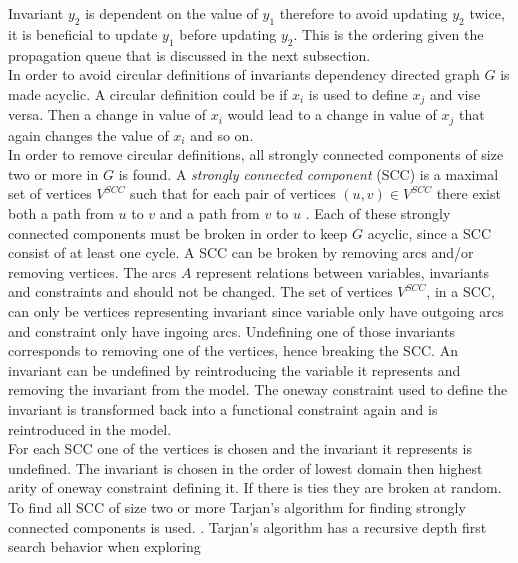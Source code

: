 Invariant $y_2$ is dependent on the value of $y_1$ therefore to avoid updating $y_2$ twice, it is beneficial to 
update $y_1$ before updating $y_2$. This is the ordering given the propagation queue that is discussed in the next 
subsection. \medskip \\
In order to avoid circular definitions of invariants dependency directed graph $G$ is made acyclic. A circular 
definition could be if $x_i$ is used to define $x_j$ and vise versa. Then a change in value of $x_i$ would lead to a 
change in value of $x_j$ that again changes the value of $x_i$ and so on.  \\ 
In order to remove circular definitions, all strongly connected components of size two or more in $G$ is found. A 
\emph{strongly connected component} (SCC) is a maximal set of vertices $V^{SCC}$ such that for each pair of vertices 
$(u,v) \in V^{SCC}$ there exist both a path from $u$ to $v$ and a path from $v$ to $u$ \cite[p. 1170]{cormen}. 
Each of these strongly connected components must be broken in order to keep $G$ acyclic, since a SCC consist of at 
least one cycle. A SCC can be broken by removing arcs and/or removing vertices. The arcs $A$ represent relations 
between variables, invariants and constraints and should not be changed. The set of vertices $V^{SCC}$, in a SCC, can 
only be vertices representing invariant since variable only have outgoing arcs and constraint only have ingoing arcs. 
Undefining one of those invariants corresponds to removing one of the vertices, hence breaking the SCC. An invariant can 
be undefined by reintroducing the variable it represents and removing the invariant from the model. The oneway 
constraint used to define the invariant is transformed back into a functional constraint again and is reintroduced in 
the model. \\
For each SCC one of the vertices is chosen and the invariant it represents is undefined. The invariant is chosen in the 
order of lowest domain then highest arity of oneway constraint defining it. If there is ties they are broken at random.
\\  
To find all SCC of size two or more Tarjan's algorithm for finding strongly connected components is used. . Tarjan's algorithm has a recursive depth first search behavior when exploring 
